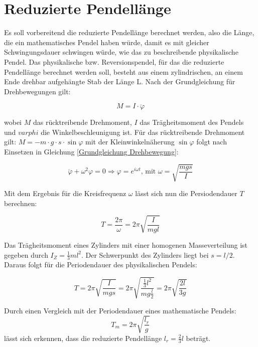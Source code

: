 \section{Reduzierte Pendellänge}

Es soll vorbereitend die reduzierte Pendellänge berechnet werden, also die Länge, die ein mathematisches Pendel haben würde, damit es mit gleicher Schwingungsdauer schwingen würde, wie das zu beschreibende physikalische Pendel. Das physikalische bzw. Reversionspendel, für das die reduzierte Pendellänge berechnet werden soll, besteht aus einem zylindrischen, an einem Ende drehbar aufgehängte Stab der Länge L.
Nach der Grundgleichung für Drehbewegungen gilt:

\begin{equation} \label{Grundgleichung Drehbewegung}
    M = I \cdot \ddot{\varphi}
\end{equation}

wobei $M$ das rücktreibende Drehmoment, $I$ das Trägheitsmoment des Pendels und $varphi$ die Winkelbeschleunigung ist. Für das rücktreibende Drehmoment gilt: $M = -m \cdot g \cdot s \cdot \sin{\varphi}$ mit der Kleinwinkelnäherung $\sin{\varphi}$ folgt nach Einsetzen in Gleichung \ref{Grundgleichung Drehbewegung}:

\begin{equation} \label{Schwingungsgleichung eines physikalischen Pendels}
\ddot{\varphi} + \omega^2\varphi = 0
\Rightarrow \varphi = e^{i \omega t} \text{, mit } \omega = \sqrt{\frac{mgs}{I}}
\end{equation}

Mit dem Ergebnis für die Kreisfrequenz $\omega$ lässt sich nun die Persiodendauer $T$ berechnen:

\begin{equation}
    T = \frac{2\pi}{\omega} = 2 \pi \sqrt{\frac{I}{mgl}}
\end{equation}

Das Trägheitsmoment eines Zylinders mit einer homogenen Masseverteilung ist gegeben durch $I_Z = \frac{1}{3} ml^2$. Der Schwerpunkt des Zylinders liegt bei $s = l/2$. Daraus folgt für die Periodendauer des physikalischen Pendels:

\begin{equation}
    T = 2 \pi \sqrt{\frac{I}{mgs}} = 2 \pi \sqrt{\frac{\frac{1}{3} l^2}{mg\frac{l}{2}}} = 2 \pi \sqrt{\frac{2l}{3g}}
\end{equation}

Durch einen Vergleich mit der Periodendauer eines mathematische Pendels: $$T_m = 2 \pi \sqrt{\frac{l_r}{g}}$$ lässt sich erkennen, dass die reduzierte Pendellänge $l_r = \frac{2}{3}l$ beträgt.

